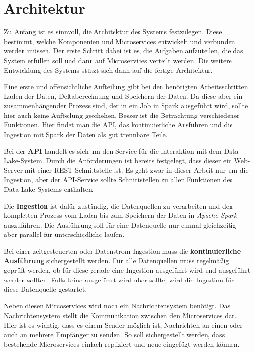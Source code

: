 \section{Architektur}
\label{sec:arch}

Zu Anfang ist es sinnvoll, die Architektur des Systems festzulegen.
Diese bestimmt, welche Komponenten und Microservices entwickelt und verbunden werden müssen.
Der erste Schritt dabei ist es, die Aufgaben aufzuteilen, die das System erfüllen soll und dann auf Microservices verteilt werden.
Die weitere Entwicklung des Systems stützt sich dann auf die fertige Architektur.

Eine erste und offensichtliche Aufteilung gibt bei den benötigten Arbeitsschritten Laden der Daten, Deltaberechnung und Speichern der Daten.
Da diese aber ein zusammenhängender Prozess sind, der in ein Job in Spark ausgeführt wird, sollte hier auch keine Aufteilung geschehen.
Besser ist die Betrachtung verschiedener Funktionen.
Hier findet man die API, das kontinuierliche Ausführen und die Ingestion mit Spark der Daten als gut trennbare Teile.

Bei der \textbf{API} handelt es sich um den Service für die Interaktion mit dem Data-Lake-System.
Durch die Anforderungen ist bereits festgelegt, dass dieser ein Web-Server mit einer REST-Schnittstelle ist.
Es geht zwar in dieser Arbeit nur um die Ingestion, aber der API-Service sollte Schnittstellen zu allen Funktionen des Data-Lake-Systems enthalten.

Die \textbf{Ingestion} ist dafür zuständig, die Datenquellen zu verarbeiten und den kompletten Prozess vom Laden bis zum Speichern der Daten in \textit{Apache Spark} auszuführen.
Die Ausführung soll für eine Datenquelle nur einmal gleichzeitig aber parallel für unterschiedliche laufen.

Bei einer zeitgesteuerten oder Datenstrom-Ingestion muss die \textbf{kontinuierliche Ausführung} sichergestellt werden.
Für alle Datenquellen muss regelmäßig geprüft werden, ob für diese gerade eine Ingestion ausgeführt wird und ausgeführt werden sollten.
Falls keine ausgeführt wird aber sollte, wird die Ingestion für diese Datenquelle gestartet.

Neben diesen Mircoservices wird noch ein Nachrichtensystem benötigt.
Das Nachrichtensystem stellt die Kommunikation zwischen den Microservices dar.
Hier ist es wichtig, dass es einem Sender möglich ist, Nachrichten an einen oder auch an mehrere Empfänger zu senden.
So soll sichergestellt werden, dass bestehende Microservices einfach repliziert und neue eingefügt werden können.

